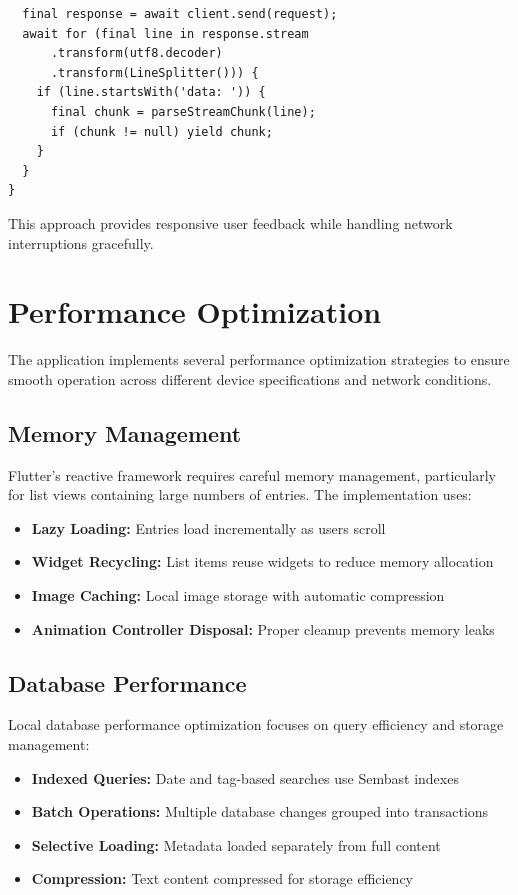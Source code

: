 \documentclass[conference]{IEEEtran}
\begin{document}
{\begin{IEEEkeywords}
\begin{verbatim}
  final response = await client.send(request);
  await for (final line in response.stream
      .transform(utf8.decoder)
      .transform(LineSplitter())) {
    if (line.startsWith('data: ')) {
      final chunk = parseStreamChunk(line);
      if (chunk != null) yield chunk;
    }
  }
}
\end{verbatim}

This approach provides responsive user feedback while handling network interruptions gracefully.

\section{Performance Optimization}

The application implements several performance optimization strategies to ensure smooth operation across different device specifications and network conditions.

\subsection{Memory Management}

Flutter's reactive framework requires careful memory management, particularly for list views containing large numbers of entries. The implementation uses:

\begin{itemize}
\item \textbf{Lazy Loading:} Entries load incrementally as users scroll
\item \textbf{Widget Recycling:} List items reuse widgets to reduce memory allocation
\item \textbf{Image Caching:} Local image storage with automatic compression
\item \textbf{Animation Controller Disposal:} Proper cleanup prevents memory leaks
\end{itemize}

\subsection{Database Performance}

Local database performance optimization focuses on query efficiency and storage management:

\begin{itemize}
\item \textbf{Indexed Queries:} Date and tag-based searches use Sembast indexes
\item \textbf{Batch Operations:} Multiple database changes grouped into transactions
\item \textbf{Selective Loading:} Metadata loaded separately from full content
\item \textbf{Compression:} Text content compressed for storage efficiency
\end{itemize}


\end{IEEEkeywords}}
\end{document}
